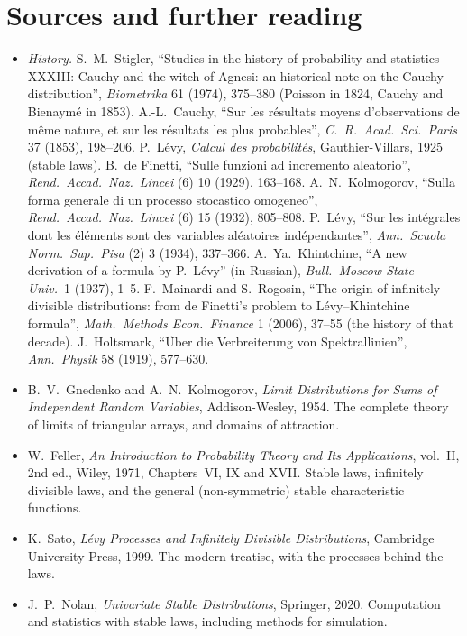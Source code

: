 \section*{Sources and further reading}

\begin{itemize}
\item \emph{History.} S.~M.~Stigler, ``Studies in the history of probability and statistics XXXIII: Cauchy and the witch of Agnesi: an historical note on the
Cauchy distribution'', \emph{Biometrika} 61 (1974), 375--380 (Poisson in 1824, Cauchy and Bienaym\'e in 1853). A.-L.~Cauchy, ``Sur les r\'esultats moyens
d'observations de m\^eme nature, et sur les r\'esultats les plus probables'', \emph{C.\ R.\ Acad.\ Sci.\ Paris} 37 (1853), 198--206. P.~L\'evy, \emph{Calcul des
probabilit\'es}, Gauthier-Villars, 1925 (stable laws). B.~de Finetti, ``Sulle funzioni ad incremento aleatorio'', \emph{Rend.\ Accad.\ Naz.\ Lincei} (6) 10 (1929),
163--168. A.~N.~Kolmogorov, ``Sulla forma generale di un processo stocastico omogeneo'', \emph{Rend.\ Accad.\ Naz.\ Lincei} (6) 15 (1932), 805--808. P.~L\'evy, ``Sur
les int\'egrales dont les \'el\'ements sont des variables al\'eatoires ind\'ependantes'', \emph{Ann.\ Scuola Norm.\ Sup.\ Pisa} (2) 3 (1934), 337--366. A.~Ya.~Khintchine,
``A new derivation of a formula by P.~L\'evy'' (in Russian), \emph{Bull.\ Moscow State Univ.}\ 1 (1937), 1--5. F.~Mainardi and S.~Rogosin, ``The origin of infinitely
divisible distributions: from de Finetti's problem to L\'evy--Khintchine formula'', \emph{Math.\ Methods Econ.\ Finance} 1 (2006), 37--55 (the history of that decade).
J.~Holtsmark, ``\"Uber die Verbreiterung von Spektrallinien'', \emph{Ann.\ Physik} 58 (1919), 577--630.
\item B.~V.~Gnedenko and A.~N.~Kolmogorov, \emph{Limit Distributions for Sums of Independent Random Variables}, Addison-Wesley, 1954. The complete theory of
limits of triangular arrays, and domains of attraction.
\item W.~Feller, \emph{An Introduction to Probability Theory and Its Applications}, vol.~II, 2nd ed., Wiley, 1971, Chapters~VI, IX and XVII. Stable laws, infinitely divisible laws,
and the general (non-symmetric) stable characteristic functions.
\item K.~Sato, \emph{L\'evy Processes and Infinitely Divisible Distributions}, Cambridge University Press, 1999. The modern treatise, with the processes behind the laws.
\item J.~P.~Nolan, \emph{Univariate Stable Distributions}, Springer, 2020. Computation and statistics with stable laws, including methods for simulation.
\end{itemize}
